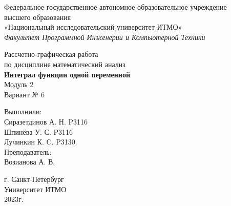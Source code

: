 \thispagestyle{empty} %
\begin{center}
	Федеральное государственное автономное образовательное учреждение\\ 
	высшего образования\\
	«Национальный исследовательский университет ИТМО»\\
	\textit{Факультет Программной Инженерии и Компьютерной Техники}\\
\end{center}
\vspace{2cm}
\begin{center}
	\large
	Рассчетно-графическая работа\\
	по дисциплине математический анализ\\
	\textbf{Интеграл функции одной переменной}\\
	Модуль 2\\
	Вариант № 6
\end{center}
\vspace{7cm}
\begin{flushright}
	Выполнили:\\
	Сиразетдинов А. Н. P3116\\
	Шпинёва У. С. P3116\\
	Лучинкин К. C. P3130. \\
	Преподаватель: \\
	Возианова А. В.\\
\end{flushright}
\vspace{6cm}
\begin{center}
	г. Санкт-Петербург\\
	Университет ИТМО\\
	2023г.
\end{center}